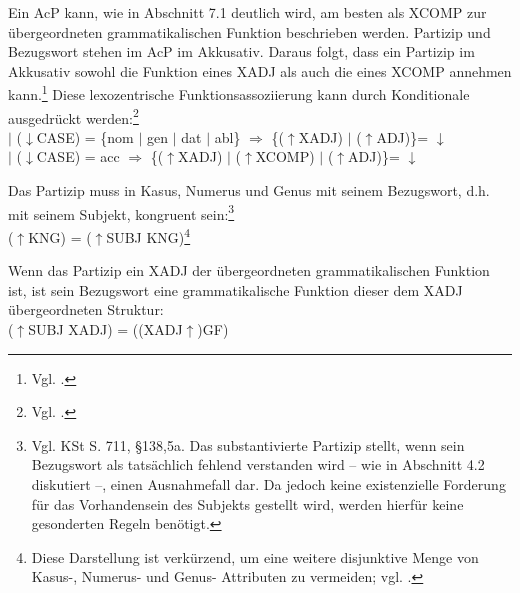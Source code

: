\documentclass[12pt,a4paper]{article}
\begin{document}
Ein AcP kann, wie in Abschnitt 7.1 deutlich wird, am besten als XCOMP zur übergeordneten grammatikalischen Funktion beschrieben werden. Partizip und Bezugswort stehen im AcP im Akkusativ. Daraus folgt, dass ein Partizip im Akkusativ sowohl die Funktion eines XADJ als auch die eines XCOMP annehmen kann.\footnote{Vgl. \cite[48]{Skript}.} Diese lexozentrische Funktionsassoziierung kann durch Konditionale ausgedrückt werden:\footnote{Vgl. \cite[48]{Skript}.} \\
$\mid$ ($\downarrow$CASE) = \{nom $\mid$ gen $\mid$ dat $\mid$ abl\} $\Rightarrow$ \{($\uparrow$XADJ) $\mid$ ($\uparrow$ADJ)\}= $\downarrow$ \\
$\mid$ ($\downarrow$CASE) = acc $\Rightarrow$ \{($\uparrow$XADJ) $\mid$ ($\uparrow$XCOMP) $\mid$ ($\uparrow$ADJ)\}= $\downarrow$

Das Partizip muss in Kasus, Numerus und Genus mit seinem Bezugswort, d.h. mit seinem Subjekt, kongruent sein:\footnote{Vgl. KSt S. 711, §138,5a. Das substantivierte Partizip stellt, wenn sein Bezugswort als tatsächlich fehlend verstanden wird -- wie in Abschnitt 4.2 diskutiert --, einen Ausnahmefall dar. Da jedoch keine existenzielle Forderung für das Vorhandensein des Subjekts gestellt wird, werden hierfür keine gesonderten Regeln benötigt.}\\ 
($\uparrow$KNG) = ($\uparrow$SUBJ KNG)\footnote{Diese Darstellung ist verkürzend, um eine weitere disjunktive Menge von Kasus-, Numerus- und Genus- Attributen zu vermeiden; vgl. \cite[49]{Skript}.}

Wenn das Partizip ein XADJ der übergeordneten grammatikalischen Funktion ist, ist sein Bezugswort eine grammatikalische Funktion dieser dem XADJ übergeordneten Struktur: \\
($\uparrow$SUBJ XADJ) = ((XADJ$\uparrow$)GF)
\end{document}
